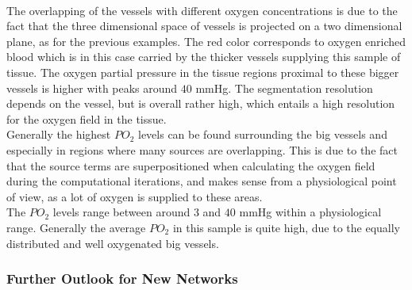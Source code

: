 \\The overlapping of the vessels with different oxygen concentrations is due to the fact that the three dimensional space of vessels is projected on a two dimensional plane, as for the previous examples. The red color corresponds to oxygen enriched blood which is in this case carried by the thicker vessels supplying this sample of tissue. The oxygen partial pressure in the tissue regions proximal to these bigger vessels is higher with peaks around $40$ mmHg. The segmentation resolution depends on the vessel, but is overall rather high, which entails a high resolution for the oxygen field in the tissue.
\\Generally the highest $PO_2$ levels can be found surrounding the big vessels and especially in regions where many sources are overlapping. This is due to the fact that the source terms are superpositioned when calculating the oxygen field during the computational iterations, and makes sense from a physiological point of view, as a lot of oxygen is supplied to these areas.
\\The $PO_2$ levels range between around $3$ and $40$ mmHg within a physiological range. Generally the average $PO_2$ in this sample is quite high, due to the equally distributed and well oxygenated big vessels.

\newpage
\subsubsection*{Further Outlook for New Networks}
\label{Outlook}

